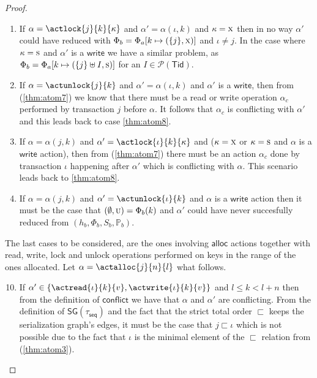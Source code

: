 {\begin{proof}
\begin{enumerate}[label=({\roman*})]
	\item If $\alpha = \actlock{j}{k}{\kappa}$ and $\alpha' = \alpha(\iota, k)$ and $\kappa = \textsc{x}$ then in no way $\alpha'$ could have reduced with $\Phi_b = \Phi_a[k \mapsto (\{j\}, \textsc{x})]$ and $\iota \neq j$. In the case where $\kappa = \textsc{s}$ and $\alpha'$ is a $\mathsf{write}$ we have a similar problem, as $\Phi_b = \Phi_a[k \mapsto (\{j\} \uplus I, \textsc{s})]$ for an $I \in \mathcal{P}(\mathsf{Tid})$.
	
	\item If $\alpha = \actunlock{j}{k}$ and $\alpha' = \alpha(\iota, k)$ and $\alpha'$ is a $\mathsf{write}$, then from (\ref{thm:atom7}) we know that there must be a read or write operation $\alpha_c$ performed by transaction $j$ before $\alpha$. It follows that $\alpha_c$ is conflicting with $\alpha'$ and this leads back to case \ref{thm:atom8}.
	
	\item If $\alpha = \alpha(j, k)$ and $\alpha' = \actlock{\iota}{k}{\kappa}$ and ($\kappa = \textsc{x}$ or $\kappa = \textsc{s}$ and $\alpha$ is a $\mathsf{write}$ action), then from (\ref{thm:atom7}) there must be an action $\alpha_c$ done by transaction $\iota$ happening after $\alpha'$ which is conflicting with $\alpha$. This scenario leads back to \ref{thm:atom8}.
	
	\item If $\alpha = \alpha(j, k)$ and $\alpha' = \actunlock{\iota}{k}$ and $\alpha$ is a $\mathsf{write}$ action then it must be the case that $(\emptyset, \textsc{u}) = \Phi_b(k)$ and $\alpha'$ could have never succesfully reduced from $(h_b, \Phi_b, S_b, \mathds{P}_b)$.
\end{enumerate}

The last cases to be considered, are the ones involving $\mathsf{alloc}$ actions together with read, write, lock and unlock operations performed on keys in the range of the ones allocated. Let $\alpha = \actalloc{j}{n}{l}$ what follows.
\begin{enumerate}[label=({\roman*})]
	\setcounter{enumi}{9}
	\item \label{thm:atom9} If $\alpha' \in \{ \actread{\iota}{k}{v}, \actwrite{\iota}{k}{v} \}$ and $l \leq k < l + n$ then from the definition of $\mathsf{conflict}$ we have that $\alpha$ and $\alpha'$ are conflicting. From the definition of $\mathsf{SG(\tau_{seq})}$ and the fact that the strict total order $\sqsubset$ keeps the serialization graph's edges, it must be the case that $j \sqsubset \iota$ which is not possible due to the fact that $\iota$ is the minimal element of the $\sqsubset$ relation from (\ref{thm:atom3}).
	

\end{enumerate}
\end{proof}}
